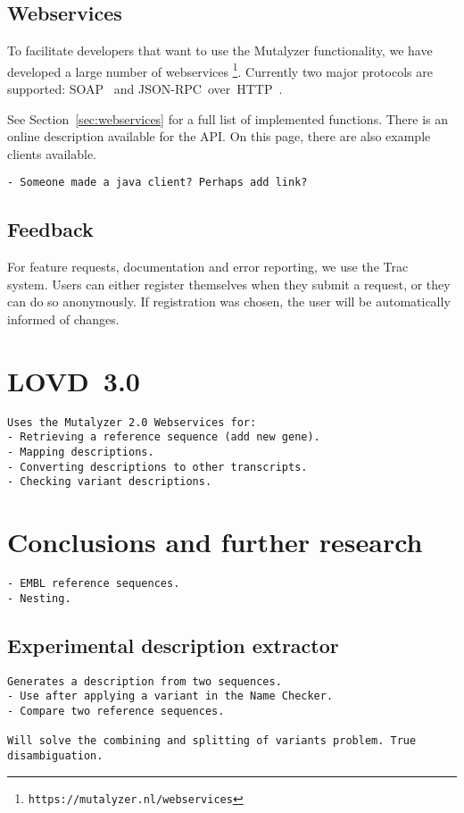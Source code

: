 \documentclass{article}
\begin{document}
\subsection{Webservices}
To facilitate developers that want to use the Mutalyzer functionality, we have
developed a large number of webservices
\footnote{\texttt{https://mutalyzer.nl/webservices}}. Currently two major
protocols are supported: SOAP~\cite{SOAP} and
JSON-RPC~over~HTTP~\cite{JSON-RPC}.

See Section~\ref{sec:webservices} for a full list of implemented functions.
There is an online description available for the API. On this page, there are
also example clients available.

\begin{verbatim}
- Someone made a java client? Perhaps add link?
\end{verbatim}

\subsection{Feedback}
For feature requests, documentation and error reporting, we use the
Trac~\cite{TRAC} system. Users can either register themselves when they submit
a request, or they can do so anonymously. If registration was chosen, the user
will be automatically informed of changes.

\section{LOVD~3.0}
\begin{verbatim}
Uses the Mutalyzer 2.0 Webservices for:
- Retrieving a reference sequence (add new gene).
- Mapping descriptions.
- Converting descriptions to other transcripts.
- Checking variant descriptions.
\end{verbatim}

\section{Conclusions and further research}\label{conclusion}
\begin{verbatim}
- EMBL reference sequences.
- Nesting.
\end{verbatim}

\subsection{Experimental description extractor}
\begin{verbatim}
Generates a description from two sequences.
- Use after applying a variant in the Name Checker.
- Compare two reference sequences.

Will solve the combining and splitting of variants problem. True
disambiguation.
\end{verbatim}
\end{document}
